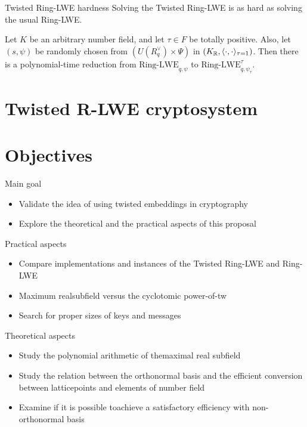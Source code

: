 \documentclass[notheorems, bigger]{beamer}
\begin{document}
\begin{frame}[label={sec:orgd91df04}]{Twisted Ring-LWE hardness}
Solving the Twisted Ring-LWE is as hard as solving the usual Ring-LWE.
\begin{theorem}
  \label{theorem:twisted-ring-lwe-hardness}
  Let $K$ be an arbitrary number field, and let $\tau \in F$ be totally positive.
  Also, let $(s,\psi)$ be randomly chosen from $(U(R_q^\vee)\times \Psi)$ in $(K_{\mathbb{R}},\langle{\cdot,\cdot}\rangle_{\tau=1})$.
  Then there is a polynomial-time reduction from $\mbox{Ring-LWE}_{q,\psi}$ to $\mbox{Ring-LWE}^\tau_{q,\psi_\tau}$.
\end{theorem}
\end{frame}
\section{Twisted R-LWE cryptosystem}
\label{sec:org0663289}
\begin{frame}[label={sec:orgc5d7884}]{}
\end{frame}
\section{Objectives}
\label{sec:orgf0d1a96}
\begin{frame}[label={sec:orgbe9ec04}]{Main goal}
\begin{itemize}
\item Validate the idea of using twisted embeddings in cryptography
\item Explore the theoretical and the practical aspects of this proposal
\end{itemize}
\end{frame}
\begin{frame}[label={sec:org62e0a38}]{Practical aspects}
\begin{itemize}
\item Compare implementations and instances of the Twisted Ring-LWE and Ring-LWE
\item Maximum realsubfield versus the cyclotomic power-of-tw
\item Search for proper sizes of keys and messages
\end{itemize}
\end{frame}
\begin{frame}[label={sec:orgdf7e6b7}]{Theoretical aspects}
\begin{itemize}
\item Study the polynomial arithmetic of themaximal real subfield
\item Study the relation between the orthonormal basis and the efficient conversion between latticepoints and elements of number field
\item Examine if it is possible toachieve a satisfactory efficiency with non-orthonormal basis
\end{itemize}
\end{frame}
\end{document}

